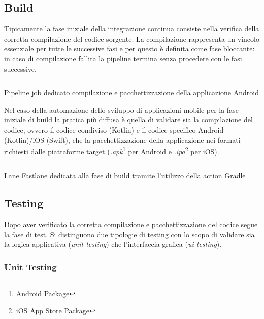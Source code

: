 \subsection{Build}
Tipicamente la fase iniziale della integrazione continua consiste nella verifica della corretta compilazione del codice sorgente. La compilazione rappresenta un vincolo essenziale per tutte le successive fasi e per questo è definita come fase bloccante: in caso di compilazione fallita la pipeline termina senza procedere con le fasi successive.

\begin{listing}[H]
\inputminted{yaml}{code/4-buildjob}
\caption{Pipeline job dedicato compilazione e pacchettizzazione della applicazione Android}
\end{listing}

Nel caso della automazione dello sviluppo di applicazioni mobile per la fase iniziale di build la pratica più diffusa è quella di validare sia la compilazione del codice, ovvero il codice condiviso (Kotlin) e il codice specifico Android (Kotlin)/iOS (Swift), che la pacchettizzazione della applicazione nei formati richiesti dalle piattaforme target (\textit{.apk}\footnote{Android Package} per Android e \textit{.ipa}\footnote{iOS App Store Package} per iOS).

\begin{listing}[H]
\inputminted{ruby}{code/4-buildft}
\caption{Lane Fastlane dedicata alla fase di build tramite l'utilizzo della action Gradle}
\end{listing}

\subsection{Testing}
Dopo aver verificato la corretta compilazione e pacchettizzazione del codice segue la fase di test. Si distinguono due tipologie di testing con lo scopo di validare sia la logica applicativa (\textit{unit testing}) che l'interfaccia grafica (\textit{ui testing}).
\subsubsection{Unit Testing}

